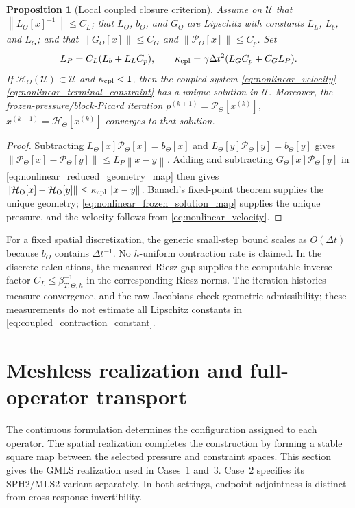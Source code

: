 \documentclass[11pt]{article}
\theoremstyle{plain}
\newtheorem{proposition}[theorem]{Proposition}
\theoremstyle{definition}
\theoremstyle{remark}
\newcommand{\dt}{\Delta t}
\newcommand{\Th}{\Theta}
\newcommand{\norm}[2][]{\left\lVert #2\right\rVert_{#1}}
\begin{document}
\begin{proposition}[Local coupled closure criterion]
\label{thm:local_coupled_closure}
Assume on $\mathcal U$ that
$\norm{L_\Th[x]^{-1}}\le C_L$; that $L_\Th$, $b_\Th$, and $G_\Th$ are
Lipschitz with constants $L_L$, $L_b$, and $L_G$; and that
$\norm{G_\Th[x]}\le C_G$ and
$\norm{\mathcal P_\Th[x]}\le C_p$.  Set
\begin{equation}
 L_P=C_L(L_b+L_LC_p),
 \qquad
 \kappa_{\rm cpl}
 =\gamma\dt^2(L_GC_p+C_GL_P).
 \label{eq:coupled_contraction_constant}
\end{equation}
If $\mathcal H_\Th(\mathcal U)\subset\mathcal U$ and
$\kappa_{\rm cpl}<1$, then the coupled system
\eqref{eq:nonlinear_velocity}--\eqref{eq:nonlinear_terminal_constraint} has a
unique solution in $\mathcal U$.  Moreover, the frozen-pressure/block-Picard
iteration $p^{(k+1)}=\mathcal P_\Th[x^{(k)}]$,
$x^{(k+1)}=\mathcal H_\Th[x^{(k)}]$ converges to that solution.
\end{proposition}

\begin{proof}
Subtracting
$L_\Th[x]\mathcal P_\Th[x]=b_\Th[x]$ and
$L_\Th[y]\mathcal P_\Th[y]=b_\Th[y]$ gives
$\norm{\mathcal P_\Th[x]-\mathcal P_\Th[y]}
\le L_P\norm{x-y}$.  Adding and subtracting
$G_\Th[x]\mathcal P_\Th[y]$ in
\eqref{eq:nonlinear_reduced_geometry_map} then gives
$\norm{\mathcal H_\Th[x]-\mathcal H_\Th[y]}
\le\kappa_{\rm cpl}\norm{x-y}$.  Banach's fixed-point theorem supplies the
unique geometry; \eqref{eq:nonlinear_frozen_solution_map} supplies the unique
pressure, and the velocity follows from \eqref{eq:nonlinear_velocity}.
\end{proof}

For a fixed spatial discretization, the generic small-step bound scales as
$O(\dt)$ because $b_\Th$ contains $\dt^{-1}$.  No $h$-uniform contraction rate
is claimed.  In the discrete calculations, the measured Riesz gap supplies
the computable inverse factor
$C_L\le\beta_{T,\Th,h}^{-1}$ in the corresponding Riesz norms.  The iteration
histories measure convergence, and the raw Jacobians check geometric
admissibility; these measurements do not estimate all Lipschitz constants in
\eqref{eq:coupled_contraction_constant}.

\section{Meshless realization and full-operator transport}
\label{sec:meshless_discretization}

The continuous formulation determines the configuration assigned to each
operator.  The spatial realization completes the construction by forming a
stable square map between the selected pressure and constraint spaces.  This
section gives the GMLS realization used in Cases~1 and~3.  Case~2 specifies
its SPH2/MLS2 variant separately.  In both settings, endpoint adjointness is
distinct from cross-response invertibility.
\end{document}
